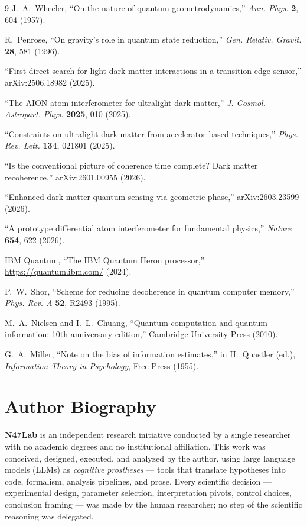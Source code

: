 \documentclass[12pt,a4paper]{article}
\begin{document}
\begin{thebibliography}{9}
J.~A.~Wheeler,
``On the nature of quantum geometrodynamics,''
\textit{Ann. Phys.} \textbf{2}, 604 (1957).

R.~Penrose,
``On gravity's role in quantum state reduction,''
\textit{Gen. Relativ. Gravit.} \textbf{28}, 581 (1996).

``First direct search for light dark matter interactions in a transition-edge sensor,''
arXiv:2506.18982 (2025).

``The AION atom interferometer for ultralight dark matter,''
\textit{J. Cosmol. Astropart. Phys.} \textbf{2025}, 010 (2025).

``Constraints on ultralight dark matter from accelerator-based techniques,''
\textit{Phys. Rev. Lett.} \textbf{134}, 021801 (2025).

``Is the conventional picture of coherence time complete? Dark matter recoherence,''
arXiv:2601.00955 (2026).

``Enhanced dark matter quantum sensing via geometric phase,''
arXiv:2603.23599 (2026).

``A prototype differential atom interferometer for fundamental physics,''
\textit{Nature} \textbf{654}, 622 (2026).

IBM Quantum,
``The IBM Quantum Heron processor,''
\url{https://quantum.ibm.com/} (2024).

P.~W.~Shor,
``Scheme for reducing decoherence in quantum computer memory,''
\textit{Phys. Rev. A} \textbf{52}, R2493 (1995).

M.~A.~Nielsen and I.~L.~Chuang,
``Quantum computation and quantum information: 10th anniversary edition,''
Cambridge University Press (2010).

G.~A.~Miller,
``Note on the bias of information estimates,''
in H.~Quastler (ed.), \textit{Information Theory in Psychology}, Free Press (1955).

\end{thebibliography}

\section*{Author Biography}

\textbf{N47Lab} is an independent research initiative conducted by a single researcher with no academic degrees and no institutional affiliation. This work was conceived, designed, executed, and analyzed by the author, using large language models (LLMs) as \textit{cognitive prostheses} --- tools that translate hypotheses into code, formalism, analysis pipelines, and prose. Every scientific decision --- experimental design, parameter selection, interpretation pivots, control choices, conclusion framing --- was made by the human researcher; no step of the scientific reasoning was delegated.
\end{document}
